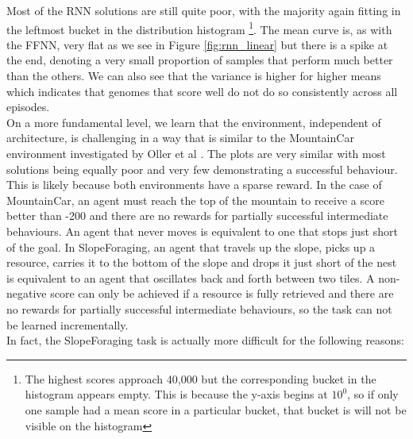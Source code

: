\documentclass[12pt]{article}
\begin{document}
Most of the RNN solutions are still quite poor, with the majority again fitting in the leftmost bucket in the distribution histogram \footnote{The highest scores approach 40,000 but the corresponding bucket in the histogram appears empty. This is because the y-axis begins at $10^0$, so if only one sample had a mean score in a particular bucket, that bucket is will not be visible on the histogram}. The mean curve is, as with the FFNN, very flat as we see in Figure \ref{fig:rnn_linear} but there is a spike at the end, denoting a very small proportion of samples that perform much better than the others. We can also see that the variance is higher for higher means which indicates that genomes that score well do not do so consistently across all episodes.\\

On a more fundamental level, we learn that the environment, independent of architecture, is challenging in a way that is similar to the MountainCar \cite{MountainCar} environment investigated by Oller et al \cite{oller:AAMAS:2020}. The plots are very similar with most solutions being equally poor and very few demonstrating a successful behaviour. This is likely because both environments have a sparse reward. In the case of MountainCar, an agent must reach the top of the mountain to receive a score better than -200 and there are no rewards for partially successful intermediate behaviours. An agent that never moves is equivalent to one that stops just short of the goal. In SlopeForaging, an agent that travels up the slope, picks up a resource, carries it to the bottom of the slope and drops it just short of the nest is equivalent to an agent that oscillates back and forth between two tiles. A non-negative score can only be achieved if a resource is fully retrieved and there are no rewards for partially successful intermediate behaviours, so the task can not be learned incrementally.\\

In fact, the SlopeForaging task is actually more difficult for the following reasons:
\end{document}
